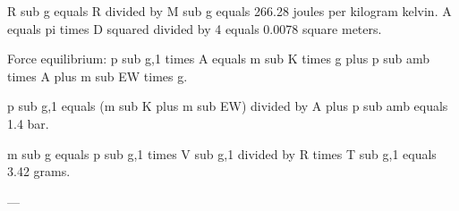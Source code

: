 R sub g equals R divided by M sub g equals 266.28 joules per kilogram kelvin.  
A equals pi times D squared divided by 4 equals 0.0078 square meters.  

Force equilibrium:  
p sub g,1 times A equals m sub K times g plus p sub amb times A plus m sub EW times g.  

p sub g,1 equals (m sub K plus m sub EW) divided by A plus p sub amb equals 1.4 bar.  

m sub g equals p sub g,1 times V sub g,1 divided by R times T sub g,1 equals 3.42 grams.  

---